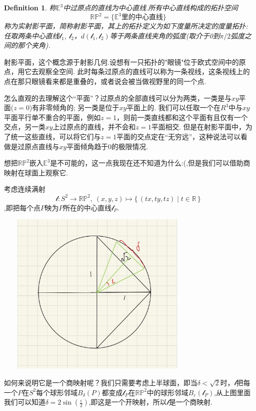 \documentclass{article}
\newtheorem{definition}[theorem]{Definition}
\newcommand*{\xfunc}[4]{{#2}\colon{#3}{#1}{#4}}
\newcommand*{\func}[3]{\xfunc{\to}{#1}{#2}{#3}}
\newcommand\Set[2]{\{\,#1\mid#2\,\}} %
\begin{document}
\begin{definition}
称$\mathbb{E}^3$中过原点的直线为中心直线.所有中心直线构成的拓扑空间\[\mathbb{R}\mathbb{P}^2=\{\mathbb{E}^3\text{里的中心直线}\}\]称为实射影平面，简称射影平面，其上的拓扑定义为如下度量所决定的度量拓扑: 任取两条中心直线$\mathcal{l}_1$, $\mathcal{l}_2$，$d(\mathcal{l}_1,\mathcal{l}_2)$等于两条直线夹角的弧度(取介于0到$\pi / 2$弧度之间的那个夹角).
\end{definition}

射影平面，这个概念源于射影几何.设想有一只拓扑的"眼镜"位于欧式空间中的原点，用它去观察全空间. 此时每条过原点的直线可以称为一条视线，这条视线上的点在那只眼镜看来都是重叠的，或者说会被当做视野里的同一个点.

怎么直观的去理解这个“平面”？过原点的全部直线可以分为两类，一类是与$xy$平面($z=0$)有非零倾角的; 另一类是位于$xy$平面上的. 我们可以任取一个在$R^3$中与$xy$平面平行单不重合的平面，例如$z=1$，则前一类直线都和这个平面有且仅有一个交点，另一类$xy$上过原点的直线，并不会和$z=1$平面相交. 但是在射影平面中，为了统一这些直线，可以将它们与$z=1$平面的交点定在“无穷远”，这种说法可以看做是过原点直线与$xy$平面倾角趋于0的极限情况.

想把$\mathbb{R}\mathbb{P}^2$嵌入$\mathbb{E}^3$是不可能的，这一点我现在还不知道为什么:(,但是我们可以借助商映射在球面上观察它.

考虑连续满射\[\func{\mathcal{l}}{S^2}{\mathbb{R}\mathbb{P}^2},\ (x,y,z) \mapsto \Set{(tx,ty,tz)}{t \in \mathbb{R}}\],即把每个点$P$映为$P$所在的中心直线$\mathcal{l}_P$.
\begin{center}
\includegraphics[width=10cm, height=8cm]{images/sp2.jpg}
\end{center}

如何来说明它是一个商映射呢？我们只需要考虑上半球面，即当$\delta < \sqrt{2}$时，$\mathcal{l}$把每一个$P$在$S^2$每个球形邻域$B_\delta(P)$都变成$\mathcal{l}_P$在$\mathbb{R}\mathbb{P}^2$中的球形邻域$B_\varepsilon(\mathcal{l}_P)$,从上图里面我们可以知道$\delta=2 \sin(\frac{\varepsilon}{2})$,即这是一个开映射，所以$\mathcal{l}$是一个商映射.
\end{document}

